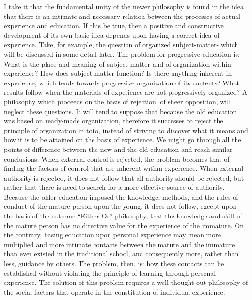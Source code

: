 I take it that the fundamental unity of the newer philosophy is found in the idea that 
there is an intimate and necessary relation between the processes of actual experience and 
education. If this be true, then a positive and constructive development of its own basic 
idea depends upon having a correct idea of experience. Take, for example, the question of 
organized subject-matter- which will be discussed in some detail later. The problem for 
progressive education is: What is the place and meaning of subject-matter and of organization within experience? How does subject-matter function? Is there anything 
inherent in experience, which tends towards progressive organization of its contents? 
What results follow when the materials of experience are not progressively organized? A 
philosophy which proceeds on the basis of rejection, of sheer opposition, will neglect 
these questions. It will tend to suppose that because the old education was based on 
ready-made organization, therefore it successes to reject the principle of organization in 
toto, instead of striving to discover what it means and how it is to be attained on the basis 
of experience. We might go through all the points of difference between the new and the 
old education and reach similar conclusions. When external control is rejected, the 
problem becomes that of finding the factors of control that are inherent within 
experience. When external authority is rejected, it does not follow that all authority 
should be rejected, but rather that there is need to search for a more effective source of 
authority. Because the older education imposed the knowledge, methods, and the rules of 
conduct of the mature person upon the young, it does not follow, except upon the basis of 
the extreme \enquote{Either-Or} philosophy, that the knowledge and skill of the mature person has 
no directive value for the experience of the immature. On the contrary, basing education 
upon personal experience may mean more multiplied and more intimate contacts between 
the mature and the immature than ever existed in the traditional school, and consequently 
more, rather than less, guidance by others. The problem, then, is: how these contacts can 
be established without violating the principle of learning through personal experience. 
The solution of this problem requires a well thought-out philosophy of the social factors 
that operate in the constitution of individual experience. 

